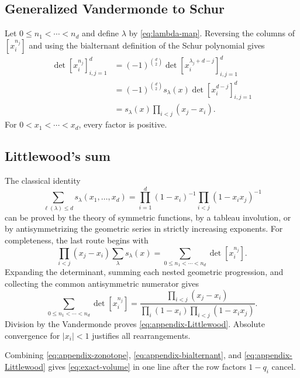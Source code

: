 \documentclass[11pt,a4paper]{article}
\theoremstyle{definition}
\theoremstyle{remark}
\begin{document}
\subsection{Generalized Vandermonde to Schur}

Let $0\le n_1<\cdots<n_d$ and define $\lambda$ by \eqref{eq:lambda-map}.  Reversing the columns of $[x_i^{n_j}]$ and using the bialternant definition of the Schur polynomial gives
\begin{align}
 \det[x_i^{n_j}]_{i,j=1}^d
 &=(-1)^{\binom d2}
   \det[x_i^{\lambda_j+d-j}]_{i,j=1}^d\\
 &=(-1)^{\binom d2}s_\lambda(x)
   \det[x_i^{d-j}]_{i,j=1}^d\\
 &=s_\lambda(x)\prod_{i<j}(x_j-x_i).
 \label{eq:appendix-bialternant}
\end{align}
For $0<x_1<\cdots<x_d$, every factor is positive.

\subsection{Littlewood's sum}

The classical identity~\cite{Macdonald,StanleyEC2}
\begin{equation}
  \sum_{\ell(\lambda)\le d}s_\lambda(x_1,\ldots,x_d)
   =\prod_{i=1}^d(1-x_i)^{-1}
    \prod_{i<j}(1-x_ix_j)^{-1}
  \label{eq:appendix-Littlewood}
\end{equation}
can be proved by the theory of symmetric functions, by a tableau involution, or by antisymmetrizing the geometric series in strictly increasing exponents.  For completeness, the last route begins with
\begin{equation}
 \prod_{i<j}(x_j-x_i)
 \sum_\lambda s_\lambda(x)
  =\sum_{0\le n_1<\cdots<n_d}\det[x_i^{n_j}].
 \label{eq:antisym-sum}
\end{equation}
Expanding the determinant, summing each nested geometric progression, and collecting the common antisymmetric numerator gives
\begin{equation}
 \sum_{0\le n_1<\cdots<n_d}\det[x_i^{n_j}]
  =\frac{\prod_{i<j}(x_j-x_i)}
         {\prod_i(1-x_i)\prod_{i<j}(1-x_ix_j)}.
 \label{eq:strict-exponent-sum}
\end{equation}
Division by the Vandermonde proves \eqref{eq:appendix-Littlewood}.  Absolute convergence for $|x_i|<1$ justifies all rearrangements.

Combining \eqref{eq:appendix-zonotope}, \eqref{eq:appendix-bialternant}, and \eqref{eq:appendix-Littlewood} gives \eqref{eq:exact-volume} in one line after the row factors $1-q_i$ cancel.
\end{document}

